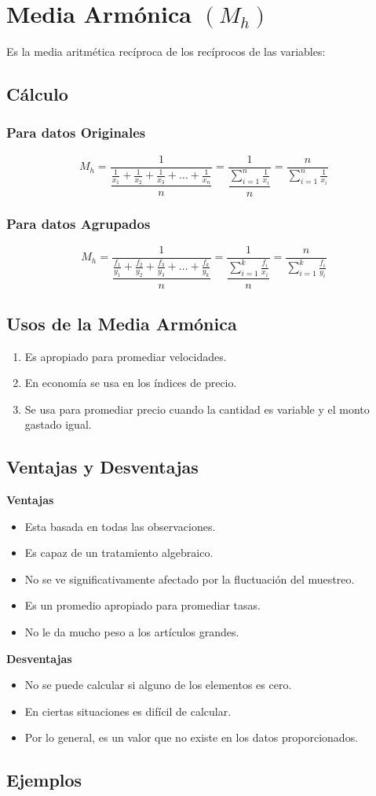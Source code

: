 \section{Media Armónica $(M_h)$}
Es la media aritmética recíproca de los recíprocos de las variables:
\subsection{Cálculo}
\subsubsection{Para datos Originales}
$$M_h=\dfrac{1}{\dfrac{\frac{1}{x_1}+\frac{1}{x_2}+\frac{1}{x_3}+\ldots+\frac{1}{x_n} }{n}}=\dfrac{1}{\dfrac{\displaystyle\sum_{i=1}^{n}\frac{1}{x_i}}{n}}=\dfrac{n}{\displaystyle\sum_{i=1}^{n}\frac{1}{x_i}}$$
\subsubsection{Para datos Agrupados}
$$M_h=\dfrac{1}{\dfrac{\frac{f_1}{y_1}+\frac{f_2}{y_2}+\frac{f_3}{y_3}+\ldots+\frac{f_k}{y_k} }{n}}=\dfrac{1}{\dfrac{\displaystyle\sum_{i=1}^{k}\frac{f_i}{x_i}}{n}}=\dfrac{n}{\displaystyle\sum_{i=1}^{k}\frac{f_i}{y_i}}$$
\subsection{Usos de la Media Armónica}
\begin{enumerate}
\item Es apropiado para promediar velocidades.
\item En economía se usa en los índices de precio.
\item Se usa para promediar precio cuando la cantidad es variable y el monto gastado igual.
\end{enumerate}
\subsection{Ventajas y Desventajas}
\begin{multicols}{2}
\textbf{Ventajas}
\begin{itemize}
\item Esta basada en todas las observaciones.
\item Es capaz de un tratamiento algebraico.
\item No se ve significativamente afectado por la fluctuación del muestreo.
\item Es un promedio apropiado para promediar tasas.
\item No le da mucho peso a los artículos grandes.
\end{itemize}
\columnbreak
\textbf{Desventajas}
\begin{itemize}
\item No se puede calcular si alguno de los elementos es cero.
\item En ciertas situaciones es difícil de calcular.
\item Por lo general, es un valor que no existe en los datos proporcionados.
\end{itemize}
\end{multicols}
\subsection{Ejemplos}